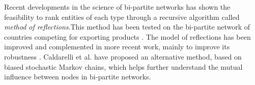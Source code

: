 Recent developments in the science of bi-partite networks has shown the feasibility to rank entities of each type through a recursive algorithm called  {\it method of reflections}.This method has been tested on the bi-partite network of countries competing for exporting products \cite{hidalgo2007,hidalgo2009}. The model of reflections has been improved and complemented in more recent work, mainly to improve its robustness \cite{tacchella2012new, cristelli2012competitors, tacchella2013economic, cristelli2013measuring}. Caldarelli et al. \cite{caldarelli2012network} have proposed an alternative method, based on biased stochastic Markov chains, which helps further understand the mutual influence between nodes in bi-partite networks.









